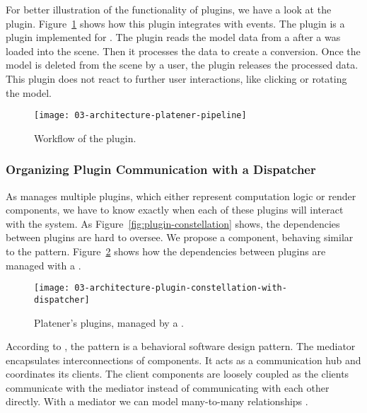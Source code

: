 \documentclass[../../ClassicThesis.tex]{subfiles}
\begin{document}
For better illustration of the functionality of plugins, we
have a look at the  plugin.
Figure~\ref{fig:workflow-platener-pipeline} shows how this
plugin integrates with {\convertify} events. The
 plugin is a plugin implemented for
{\platener}. The plugin reads the model data from a
 after a {\threedmodel} was loaded into the
scene. Then it processes the data to create a {\lasercutter}
conversion. Once the model is deleted from the scene by a
user, the plugin releases the processed data. This plugin
does not react to further user interactions, like clicking
or rotating the model.


\begin{figure}[h]
  \centering
  \texttt{[image: 03-architecture-platener-pipeline]}
  \caption{Workflow of the  plugin.}
  \label{fig:workflow-platener-pipeline}
\end{figure}

\subsubsection{Organizing Plugin Communication with a
  Dispatcher}


As {\convertify} manages multiple plugins, which either represent
computation logic or render components, we have to know exactly when
each of these plugins will interact with the system. As
Figure~\ref{fig:plugin-constellation} shows, the dependencies between
plugins are hard to oversee. We propose a 
component, behaving similar to the  pattern.
Figure~\ref{fig:plugin-constellation-with-dispatcher} shows how the
dependencies between plugins are managed with a .

\begin{figure}[h]
  \centering
  \texttt{[image: 03-architecture-plugin-constellation-with-dispatcher]}
  \caption{Platener's plugins, managed by a .}
  \label{fig:plugin-constellation-with-dispatcher}
\end{figure}

According to \citet{gof}, the  pattern is a
behavioral software design pattern. The mediator encapsulates
interconnections of components. It acts as a communication hub and
coordinates its clients. The client components are loosely coupled as
the clients communicate with the mediator instead of communicating
with each other directly. With a mediator we can model many-to-many
relationships \cite[p. 273]{gof}.
\end{document}
